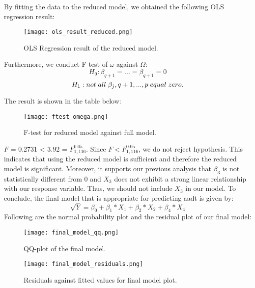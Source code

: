 \documentclass[english]{article}
\begin{document}
By fitting the data to the reduced model, we obtained the following OLS regression result: 

\begin{figure}[H]
	\begin{centering}
  		\texttt{[image: ols\_result\_reduced.png]}
  		\caption{OLS Regression result of the reduced model. \label{figure11}
}
	\end{centering}
\end{figure}

Furthermore, we conduct F-test of $\omega$ against $\Omega$:
$$ H_0: \beta_{q+1} = ... = \beta_{q+1} = 0$$ 
$$ H_1: not \thickspace all \thickspace \beta_{j},q+1,...,p \thickspace equal \thickspace zero. $$

The result is shown in the table below: 
\begin{figure}[H]
	\begin{centering}
  		\texttt{[image: ftest\_omega.png]}
  		\caption{F-test for reduced model against full model. \label{ftest_omega}
}
	\end{centering}
\end{figure}


$F$ = 0.2731 < 3.92 = $F_{1,116}^{0.05}$. Since $F < F_{1,116}^{0.05}$, we do not reject hypothesis. This indicates that using the reduced model is sufficient and therefore the reduced model is significant. Moreover, it supports our previous analysis that $\beta_3$ is not statistically different from 0 and $X_3$ does not exhibit a strong linear relationship with our response variable. Thus, we should not include $X_3$ in our model. To conclude, the final model that is appropriate for predicting aadt is given by: 
$$\sqrt{Y} =  \beta_0+\beta_1*X_1+\beta_2*X_2+\beta_4*X_4$$
Following are the normal probability plot and the residual plot of our final model:
\begin{figure}[H]
	\begin{centering}
  		\texttt{[image: final\_model\_qq.png]}
  		\caption{QQ-plot of the final model. \label{final_qq}
}
	\end{centering}
\end{figure}

\begin{figure}[H]
	\begin{centering}
  		\texttt{[image: final\_model\_residuals.png]}
  		\caption{Residuals against fitted values for final model plot. \label{final_residuals}
}
	\end{centering}
\end{figure}
\end{document}
